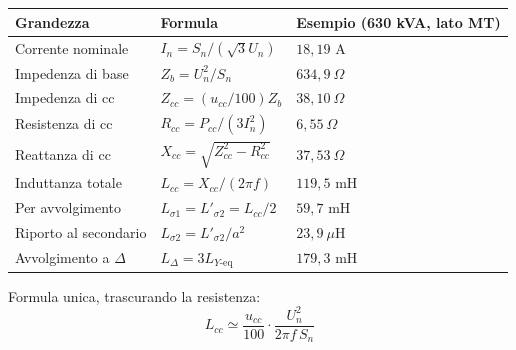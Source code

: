 \documentclass[11pt,a4paper]{article}
\begin{document}
\begin{center}
\begin{tabular}{lll}
\toprule
Grandezza & Formula & Esempio (630 kVA, lato MT)\\
\midrule
Corrente nominale     & $I_n = S_n/(\sqrt3 U_n)$              & $18{,}19$ A \\
Impedenza di base     & $Z_b = U_n^2/S_n$                      & $634{,}9\ \Omega$ \\
Impedenza di cc       & $Z_{cc} = (u_{cc}/100) Z_b$            & $38{,}10\ \Omega$ \\
Resistenza di cc      & $R_{cc} = P_{cc}/(3I_n^2)$             & $6{,}55\ \Omega$ \\
Reattanza di cc       & $X_{cc} = \sqrt{Z_{cc}^2-R_{cc}^2}$    & $37{,}53\ \Omega$ \\
Induttanza totale     & $L_{cc} = X_{cc}/(2\pi f)$             & $119{,}5$ mH \\
Per avvolgimento      & $L_{\sigma 1}=L'_{\sigma 2}=L_{cc}/2$  & $59{,}7$ mH \\
Riporto al secondario & $L_{\sigma 2} = L'_{\sigma 2}/a^2$     & $23{,}9\ \mu$H \\
Avvolgimento a $\Delta$ & $L_\Delta = 3 L_{Y\text{-eq}}$       & $179{,}3$ mH \\
\bottomrule
\end{tabular}
\end{center}

Formula unica, trascurando la resistenza:
\begin{equation}
\boxed{\;L_{cc} \simeq \frac{u_{cc}}{100}\cdot \frac{U_n^2}{2\pi f\,S_n}\;}
\end{equation}
\end{document}

